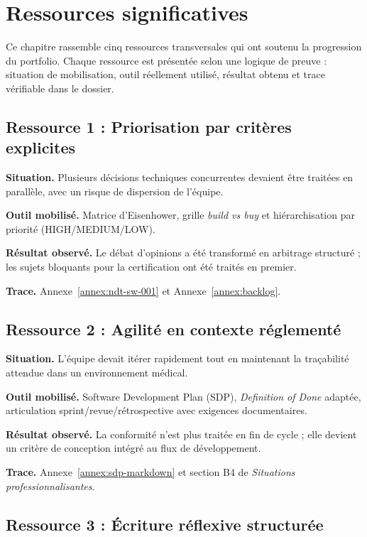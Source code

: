 \chapter{Ressources significatives}
\label{chap:ressources_significatives}

Ce chapitre rassemble cinq ressources transversales qui ont soutenu la progression du portfolio. Chaque ressource est présentée selon une logique de preuve : situation de mobilisation, outil réellement utilisé, résultat obtenu et trace vérifiable dans le dossier.

\section{Ressource 1 : Priorisation par critères explicites}

\textbf{Situation.} Plusieurs décisions techniques concurrentes devaient être traitées en parallèle, avec un risque de dispersion de l'équipe.

\textbf{Outil mobilisé.} Matrice d'Eisenhower, grille \textit{build vs buy} et hiérarchisation par priorité (HIGH/MEDIUM/LOW).

\textbf{Résultat observé.} Le débat d'opinions a été transformé en arbitrage structuré ; les sujets bloquants pour la certification ont été traités en premier.

\textbf{Trace.} Annexe~\ref{annex:ndt-sw-001} et Annexe~\ref{annex:backlog}.

\section{Ressource 2 : Agilité en contexte réglementé}

\textbf{Situation.} L'équipe devait itérer rapidement tout en maintenant la traçabilité attendue dans un environnement médical.

\textbf{Outil mobilisé.} Software Development Plan (SDP), \textit{Definition of Done} adaptée, articulation sprint/revue/rétrospective avec exigences documentaires.

\textbf{Résultat observé.} La conformité n'est plus traitée en fin de cycle ; elle devient un critère de conception intégré au flux de développement.

\textbf{Trace.} Annexe~\ref{annex:sdp-markdown} et section B4 de \textit{Situations professionnalisantes}.

\section{Ressource 3 : Écriture réflexive structurée}

